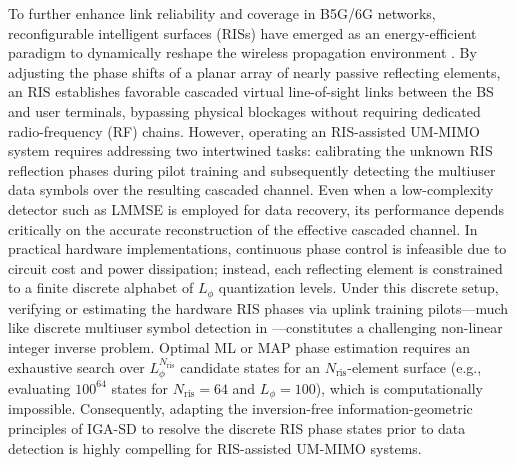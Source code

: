 \documentclass[conference]{IEEEtran}
\begin{document}
To further enhance link reliability and coverage in B5G/6G networks, reconfigurable intelligent surfaces (RISs) have emerged as an energy-efficient paradigm to dynamically reshape the wireless propagation environment \cite{b8}. By adjusting the phase shifts of a planar array of nearly passive reflecting elements, an RIS establishes favorable cascaded virtual line-of-sight links between the BS and user terminals, bypassing physical blockages without requiring dedicated radio-frequency (RF) chains. However, operating an RIS-assisted UM-MIMO system requires addressing two intertwined tasks: calibrating the unknown RIS reflection phases during pilot training and subsequently detecting the multiuser data symbols over the resulting cascaded channel. Even when a low-complexity detector such as LMMSE is employed for data recovery, its performance depends critically on the accurate reconstruction of the effective cascaded channel. In practical hardware implementations, continuous phase control is infeasible due to circuit cost and power dissipation; instead, each reflecting element is constrained to a finite discrete alphabet of $L_{\phi}$ quantization levels. Under this discrete setup, verifying or estimating the hardware RIS phases via uplink training pilots—much like discrete multiuser symbol detection in \cite{b1}—constitutes a challenging non-linear integer inverse problem. Optimal ML or MAP phase estimation requires an exhaustive search over $L_{\phi}^{N_{\mathrm{ris}}}$ candidate states for an $N_{\mathrm{ris}}$-element surface (e.g., evaluating $100^{64}$ states for $N_{\mathrm{ris}}=64$ and $L_{\phi}=100$), which is computationally impossible. Consequently, adapting the inversion-free information-geometric principles of IGA-SD \cite{b1} to resolve the discrete RIS phase states prior to data detection is highly compelling for RIS-assisted UM-MIMO systems.
\end{document}
